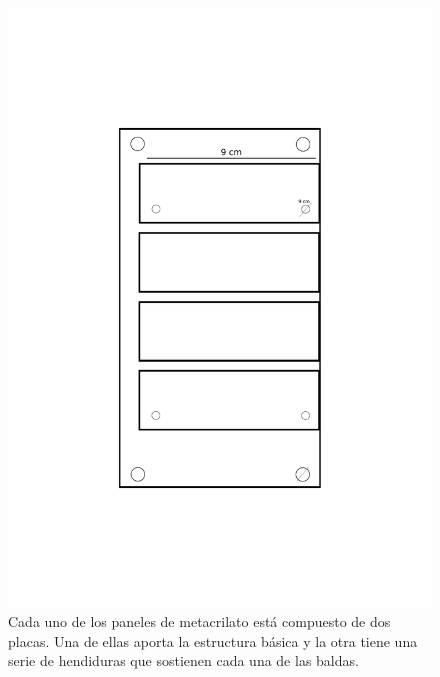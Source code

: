 \documentclass{article}
\begin{document}
\begin{figure}[H]
\centering
\includegraphics[height=0.6\textheight]{planos/schema}
\caption{Cada uno de los paneles de metacrilato está compuesto de dos placas. Una de ellas aporta la estructura básica y la otra tiene una serie de hendiduras que sostienen cada una de las baldas.}
\end{figure}

\end{document}
